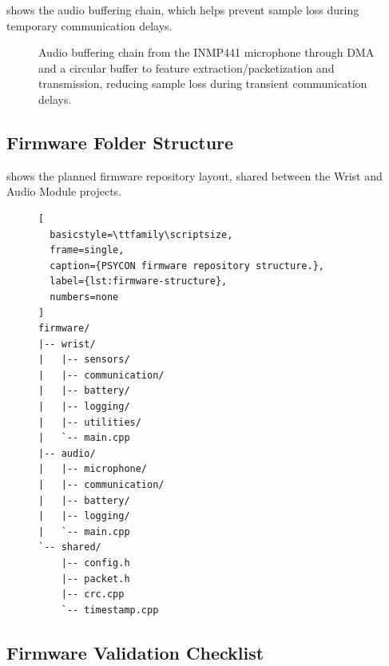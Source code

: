  shows the audio buffering chain, which helps prevent sample loss during temporary communication delays.

\begin{figure}[H]
\centering
{}
\caption{Audio buffering chain from the INMP441 microphone through DMA and a circular buffer to feature extraction/packetization and transmission, reducing sample loss during transient communication delays.}
\label{fig:audio-buffering}
\end{figure}

\subsection{Firmware Folder Structure}
\label{sec:firmware-folder-structure}

 shows the planned firmware repository layout, shared between the Wrist and Audio Module projects.

\begin{figure}[H]
\centering
\begin{lstlisting}[
  basicstyle=\ttfamily\scriptsize,
  frame=single,
  caption={PSYCON firmware repository structure.},
  label={lst:firmware-structure},
  numbers=none
]
firmware/
|-- wrist/
|   |-- sensors/
|   |-- communication/
|   |-- battery/
|   |-- logging/
|   |-- utilities/
|   `-- main.cpp
|-- audio/
|   |-- microphone/
|   |-- communication/
|   |-- battery/
|   |-- logging/
|   `-- main.cpp
`-- shared/
    |-- config.h
    |-- packet.h
    |-- crc.cpp
    `-- timestamp.cpp
\end{lstlisting}
\end{figure}

\subsection{Firmware Validation Checklist}
\label{sec:firmware-validation-checklist}


